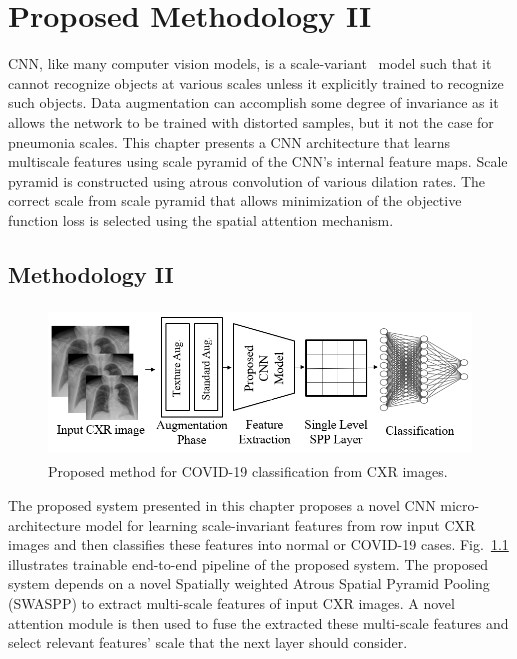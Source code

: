 
\chapter{Proposed Methodology II} %

\label{chp:proposed2} %


CNN, like many computer vision models, is a scale-variant~\cite{van2017learning} model such that it cannot recognize objects at various scales unless it explicitly trained to recognize such objects. Data augmentation can accomplish some degree of invariance as it allows the network to be trained with distorted samples, but it not the case for pneumonia scales. This chapter presents a CNN architecture that learns multiscale features using scale pyramid of the  CNN's internal feature maps. Scale pyramid is constructed using atrous convolution of various dilation rates. The correct scale from scale pyramid that allows minimization of the objective function loss is selected using the spatial attention mechanism. 
\section{Methodology II} 

\begin{center}
    \begin{figure}[htbp]
    \centerline{\includegraphics[height=40mm,width=15cm]{Figures/ProposedPipe.png}}
    \caption{Proposed method for COVID-19 classification from CXR images.}\label{ProposedPipe}\end{figure}\end{center}
    
The proposed system presented in this chapter proposes a novel CNN micro-architecture model for learning scale-invariant features from row input CXR images and then classifies these features into normal or COVID-19 cases. Fig.~\ref{ProposedPipe} illustrates trainable end-to-end pipeline of the proposed system. The proposed system depends on a novel Spatially weighted Atrous Spatial Pyramid Pooling (SWASPP) to extract multi-scale features of input CXR images. A novel attention module is then used to fuse the extracted these multi-scale features and select relevant features' scale that the next layer should consider.
